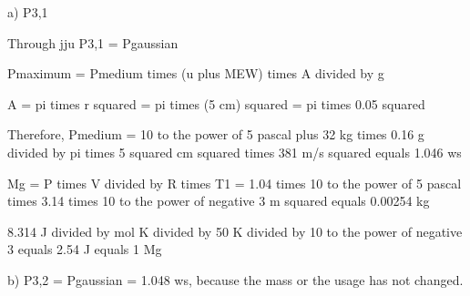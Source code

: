 a) P3,1

Through jju P3,1 = Pgaussian

Pmaximum = Pmedium times (u plus MEW) times A divided by g

A = pi times r squared = pi times (5 cm) squared = pi times 0.05 squared

Therefore, Pmedium = 10 to the power of 5 pascal plus 32 kg times 0.16 g divided by pi times 5 squared cm squared times 381 m/s squared equals 1.046 ws

Mg = P times V divided by R times T1 = 1.04 times 10 to the power of 5 pascal times 3.14 times 10 to the power of negative 3 m squared equals 0.00254 kg

8.314 J divided by mol K divided by 50 K divided by 10 to the power of negative 3 equals 2.54 J equals 1 Mg

b) P3,2 = Pgaussian = 1.048 ws, because the mass or the usage has not changed.